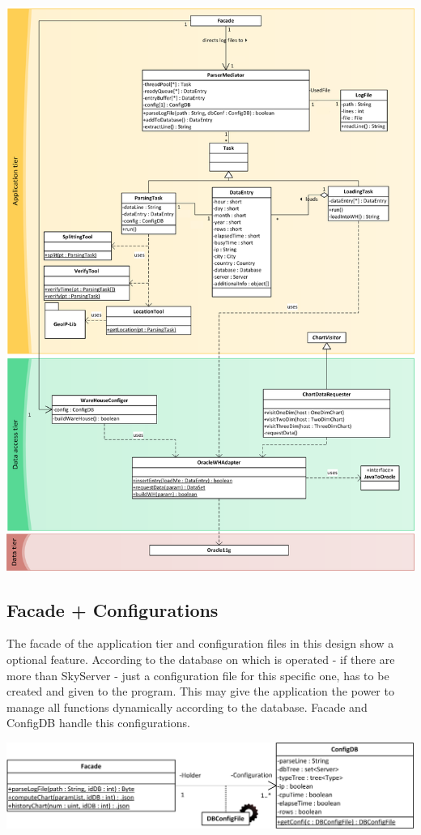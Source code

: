 \begin{center}
\includegraphics[width=0.9\linewidth]{Pictures/AppTierDia2.png}
\end{center}  

\subsection{Facade + Configurations}
The facade of the application tier and configuration files in this design show a
optional feature. According to the database on which is operated - if there are more
than SkyServer - just a configuration file for this specific one, has to be created and
given to the program. This may give the application the power to manage all functions dynamically
according to the database. Facade and ConfigDB handle this configurations.


\begin{center}
\includegraphics{Pictures/Parts/FacadeConfi.png}
\end{center}   

